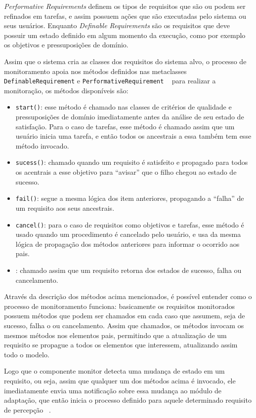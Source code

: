 \textit{Performative Requirements} definem os tipos de requisitos que são ou podem ser refinados em tarefas, e assim possuem ações que são executadas pelo sistema ou seus usuários. Enquanto \textit{Definable Requirements} são os requisitos que deve possuir um estado definido em algum momento da execução, como por exemplo os objetivos e pressuposições de domínio.

Assim que o sistema cria as classes dos requisitos do sistema alvo, o processo de monitoramento apoia nos métodos definidos nas metaclasses \texttt{DefinableRequirement} e \texttt{PerformativeRequirement} ~\cite{tesevitor} para realizar a monitoração, os métodos disponíveis são:
\begin{itemize}
	\item \texttt{start()}: esse método é chamado nas classes de critérios de qualidade e pressuposições de domínio imediatamente antes da análise de seu estado de satisfação. Para o caso de tarefas, esse método é chamado assim que um usuário inicia uma tarefa, e então todos os ancestrais a essa também tem esse método invocado.
	\item \texttt{sucess()}: chamado quando um requisito é satisfeito e propagado para todos os acentrais a esse objetivo para ``avisar'' que o filho chegou ao estado de sucesso.
	\item \texttt{fail()}: segue a mesma lógica dos item anteriores, propagando a ``falha'' de um requisito aos seus ancestrais.
	\item \texttt{cancel()}: para o caso de requisitos como objetivos e tarefas, esse método é usado quando um procedimento é cancelado pelo usuário, e usa da mesma lógica de propagação dos métodos anteriores para informar o ocorrido aos pais.
	\item {}: chamado assim que um requisito retorna dos estados de sucesso, falha ou cancelamento.
\end{itemize}

Através da descrição dos métodos acima mencionados, é possível entender como o processo de monitoramento funciona: basicamente os requisitos monitorados possuem métodos que podem ser chamados em cada caso que assumem, seja de sucesso, falha o ou cancelamento. Assim que chamados, os métodos invocam os mesmos métodos nos elementos pais, permitindo que a atualização de um requisito se propague a todos os elementos que interessem, atualizando assim todo o modelo.

Logo que o componente monitor detecta uma mudança de estado em um requisito, ou seja, assim que qualquer um dos métodos acima é invocado, ele imediatamente envia uma notificação sobre essa mudança ao módulo de adaptação, que então inicia o processo definido para aquele determinado requisito de percepção ~\cite{tesevitor}.

